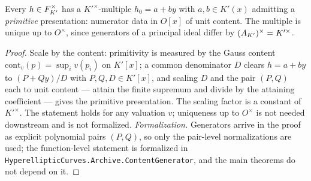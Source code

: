 \begin{lemma}
\label{lem:content}
\leanok
{}
Every $h \in F_{K'}^\times$ has a $K'^\times$-multiple $h_0 = a + by$ with
$a, b \in K'(x)$ admitting a \emph{primitive} presentation: numerator data in $O[x]$ of
unit content. The multiple is unique up to $O^\times$, since generators of a principal
ideal differ by $(A_{K'})^\times = K'^\times$.
\end{lemma}
\begin{proof}
\leanok
Scale by the content: primitivity is measured by the Gauss content
$\mathrm{cont}_v(p) = \sup_i v(p_i)$ on $K'[x]$; a common denominator $D$ clears
$h = a + by$ to $(P + Qy)/D$ with $P, Q, D \in K'[x]$, and scaling $D$ and the pair
$(P,Q)$ each to unit content --- attain the finite supremum and divide by the attaining
coefficient --- gives the primitive presentation. The scaling factor is a constant of
$K'^\times$. The statement holds for any valuation $v$; uniqueness up to $O^\times$ is
not needed downstream and is not formalized. \emph{Formalization.} Generators arrive in
the proof as explicit polynomial pairs $(P,Q)$, so only the pair-level normalizations
are used; the function-level statement is formalized in
\texttt{HyperellipticCurves.Archive.ContentGenerator}, and the main theorems do not depend on
it.
\end{proof}

